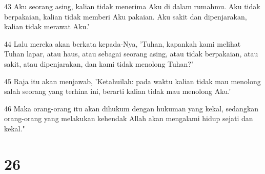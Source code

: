\par 43 Aku seorang asing, kalian tidak menerima Aku di dalam rumahmu. Aku tidak berpakaian, kalian tidak memberi Aku pakaian. Aku sakit dan dipenjarakan, kalian tidak merawat Aku.'
\par 44 Lalu mereka akan berkata kepada-Nya, 'Tuhan, kapankah kami melihat Tuhan lapar, atau haus, atau sebagai seorang asing, atau tidak berpakaian, atau sakit, atau dipenjarakan, dan kami tidak menolong Tuhan?'
\par 45 Raja itu akan menjawab, 'Ketahuilah: pada waktu kalian tidak mau menolong salah seorang yang terhina ini, berarti kalian tidak mau menolong Aku.'
\par 46 Maka orang-orang itu akan dihukum dengan hukuman yang kekal, sedangkan orang-orang yang melakukan kehendak Allah akan mengalami hidup sejati dan kekal."

\chapter{26}

